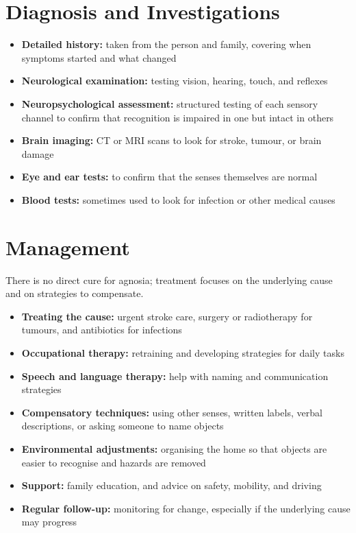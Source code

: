 \section*{Diagnosis and Investigations}
\begin{itemize}
    \item \textbf{Detailed history:} taken from the person and family, covering when symptoms started and what changed
    \item \textbf{Neurological examination:} testing vision, hearing, touch, and reflexes
    \item \textbf{Neuropsychological assessment:} structured testing of each sensory channel to confirm that recognition is impaired in one but intact in others
    \item \textbf{Brain imaging:} CT or MRI scans to look for stroke, tumour, or brain damage
    \item \textbf{Eye and ear tests:} to confirm that the senses themselves are normal
    \item \textbf{Blood tests:} sometimes used to look for infection or other medical causes
\end{itemize}

\section*{Management}
There is no direct cure for agnosia; treatment focuses on the underlying cause and on strategies to compensate.

\begin{itemize}
    \item \textbf{Treating the cause:} urgent stroke care, surgery or radiotherapy for tumours, and antibiotics for infections
    \item \textbf{Occupational therapy:} retraining and developing strategies for daily tasks
    \item \textbf{Speech and language therapy:} help with naming and communication strategies
    \item \textbf{Compensatory techniques:} using other senses, written labels, verbal descriptions, or asking someone to name objects
    \item \textbf{Environmental adjustments:} organising the home so that objects are easier to recognise and hazards are removed
    \item \textbf{Support:} family education, and advice on safety, mobility, and driving
    \item \textbf{Regular follow-up:} monitoring for change, especially if the underlying cause may progress
\end{itemize}

